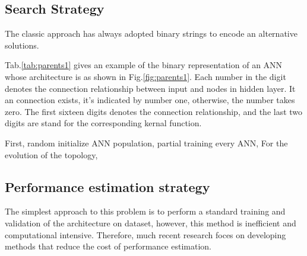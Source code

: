 

\subsection{Search Strategy}

The classic approach has always adopted binary strings to encode an alternative solutions. 

Tab.\ref{tab:parents1}  gives an example of the binary representation of an ANN
whose architecture is as shown in Fig.\ref{fig:parents1}. Each number in the
digit denotes the connection relationship between input and nodes in hidden
layer. It an connection exists, it's indicated by number one, otherwise, the
number takes zero. The first sixteen digits denotes the connection relationship, and the
last two digits are stand for  the corresponding kernal function. 

First,  random initialize ANN population, partial training every ANN, 
For the evolution of the topology,

\subsection{Performance estimation strategy}
The simplest approach to this problem is to perform a standard training and
validation of the architecture on dataset, however, this method is inefficient
and computational intensive. Therefore, much recent
research\cite{baker2017accelerating} foces on developing methods that reduce
the cost of performance estimation.




